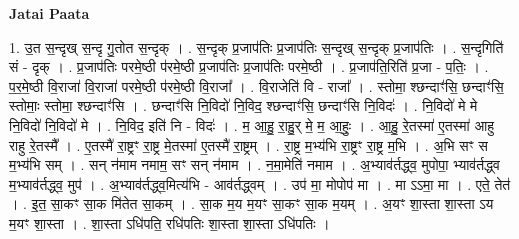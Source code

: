 \documentclass[17pt]{extarticle}
\begin{document}
\textbf{Jatai Paata} \newline

1. उ॒त स॒न्दृख् स॒न्दृ गु॒तोत स॒न्दृक् । . स॒न्दृक् प्र॒जाप॑तिः प्र॒जाप॑तिः स॒न्दृख् स॒न्दृक् प्र॒जाप॑तिः । . स॒न्दृगिति॑ सं - दृक् । . प्र॒जाप॑तिः परमे॒ष्ठी प॑रमे॒ष्ठी प्र॒जाप॑तिः प्र॒जाप॑तिः परमे॒ष्ठी । . प्र॒जाप॑ति॒रिति॑ प्र॒जा - प॒तिः॒ । . प॒र॒मे॒ष्ठी वि॒राजा॑ वि॒राजा॑ परमे॒ष्ठी प॑रमे॒ष्ठी वि॒राजा᳚ । . वि॒राजेति॑ वि - राजा᳚ । . स्तोमा॒ श्छन्दाꣳ॑सि॒ छन्दाꣳ॑सि॒ स्तोमाः॒ स्तोमा॒ श्छन्दाꣳ॑सि । . छन्दाꣳ॑सि नि॒विदो॑ नि॒विद॒ श्छन्दाꣳ॑सि॒ छन्दाꣳ॑सि नि॒विदः॑ । . नि॒विदो॑ मे मे नि॒विदो॑ नि॒विदो॑ मे । . नि॒विद॒ इति॑ नि - विदः॑ । . म॒ आ॒हु॒ रा॒हु॒र् मे॒ म॒ आ॒हुः॒ । . आ॒हु॒ रे॒तस्मा॑ ए॒तस्मा॑ आहु राहु रे॒तस्मै᳚ । . ए॒तस्मै॑ रा॒ष्ट्रꣳ रा॒ष्ट्र मे॒तस्मा॑ ए॒तस्मै॑ रा॒ष्ट्रम् । . रा॒ष्ट्र म॒भ्य॑भि रा॒ष्ट्रꣳ रा॒ष्ट्र म॒भि । . अ॒भि सꣳ स म॒भ्य॑भि सम् । . सन् न॑माम नमाम॒ सꣳ सन् न॑माम । . न॒मा॒मेति॑ नमाम । . अ॒भ्याव॑र्तद्ध्व॒ मुपोपा॒ भ्याव॑र्तद्ध्व म॒भ्याव॑र्तद्ध्व॒ मुप॑ । . अ॒भ्याव॑र्तद्ध्व॒मित्य॑भि - आव॑र्तद्ध्वम् । . उप॑ मा॒ मोपोप॑ मा । . मा ऽऽमा॒ मा । . एते॒ तेत॑ । . इ॒त॒ सा॒कꣳ सा॒क मि॑तेत सा॒कम् । . सा॒क म॒य म॒यꣳ सा॒कꣳ सा॒क म॒यम् । . अ॒यꣳ शा॒स्ता शा॒स्ता ऽय म॒यꣳ शा॒स्ता । . शा॒स्ता ऽधि॑पति॒ रधि॑पतिः शा॒स्ता शा॒स्ता ऽधि॑पतिः । \newline
\end{document}
